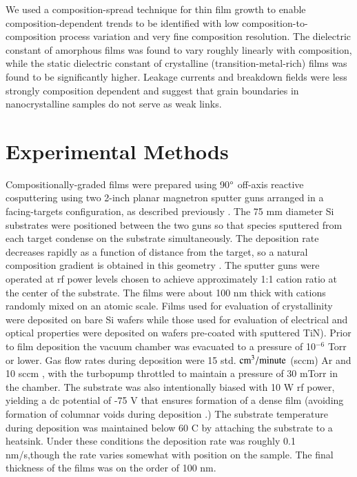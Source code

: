 We used a composition-spread technique for thin film growth to enable composition-dependent trends to be identified with low composition-to-composition process variation and very fine composition resolution. The dielectric constant of amorphous films was found to vary roughly linearly with composition, while the static dielectric constant of crystalline (transition-metal-rich) films was found to be significantly higher. Leakage currents and breakdown fields were less strongly composition dependent and suggest that grain boundaries in nanocrystalline samples do not serve as weak links.

\section{Experimental Methods}
Compositionally-graded films were prepared using 90$\degree$
off-axis reactive cosputtering using two 2-inch planar magnetron sputter guns arranged in a facing-targets configuration,
as described previously \cite{vanDover1999}.
The 75 mm diameter Si substrates were positioned
between the two guns so that species sputtered from each
target condense on the substrate simultaneously. The
deposition rate decreases rapidly as a function of distance from
the target, so a natural composition gradient is obtained in this geometry \cite{vanDover1999}.
The sputter guns were operated at rf power levels chosen to achieve approximately 1:1 cation ratio at the center of the substrate.
The films were about 100 nm thick with cations randomly mixed on an atomic scale. Films used for evaluation of crystallinity were deposited on bare Si wafers while those used for evaluation of electrical and optical properties were deposited on wafers pre-coated with sputtered TiN).
Prior to film deposition the vacuum chamber was evacuated to a pressure of 10$^{-6}$ Torr or lower.  Gas flow rates during deposition were 15 std. $\textnormal{cm}^3 / \textnormal{minute}$ (sccm) Ar and 10 sccm , with the turbopump throttled to maintain a pressure of 30 mTorr in the chamber.  
The substrate was also intentionally biased with 10 W rf power, yielding a dc potential of -75 V that ensures formation of a dense film (avoiding formation of columnar voids during deposition \cite{Barron2009}.)
The substrate temperature during deposition was maintained below 60 \textdegree C by attaching the substrate to a heatsink. Under these conditions the deposition rate was roughly 0.1 nm/s,though the rate varies somewhat with position on the sample.  The final thickness of the films was on the order of 100 nm.  

